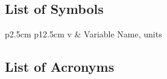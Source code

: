 
\label{fr:notation}

\def\NomenLHSwidth{2.5cm}
\def\NomenRHSwidth{12.5cm}

\subsection*{List of Symbols}\label{fr:symbols}
    \begin{supertabular}{p{\NomenLHSwidth} p{\NomenRHSwidth}}
        v & Variable Name, units \\
    \end{supertabular}

\subsection*{List of Acronyms}\label{fr:acronyms}

